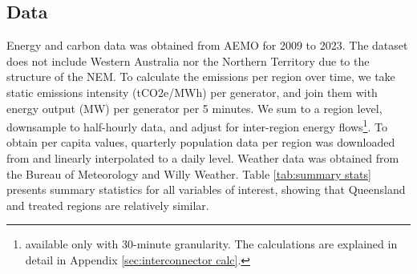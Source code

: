 \subsection{Data}
\label{sec:data}

Energy and carbon data was obtained from \ac{AEMO}\nocite{nemweb, nemweb_mmsdm} for 2009 to 2023. 
The dataset does not include Western Australia nor the Northern Territory due to the structure of the \ac{NEM}.
To calculate the emissions per region over time, we take static emissions intensity (tCO2e/MWh) per generator, and join them with energy output (MW) per generator per 5 minutes. We sum to a region level, downsample to half-hourly data, and adjust for inter-region energy flows\footnote{available only with 30-minute granularity. The calculations are explained in detail in Appendix \ref{sec:interconnector calc}.}.
To obtain per capita values, 
quarterly population data per region was downloaded from \citeauthor{abs_population} and linearly interpolated to a daily level.
Weather data was obtained from the Bureau of Meteorology\nocite{weather_data} and Willy Weather\nocite{willy_weather}. Table \ref{tab:summary stats} presents summary statistics for all variables of interest, showing that Queensland and treated regions are relatively similar.  
